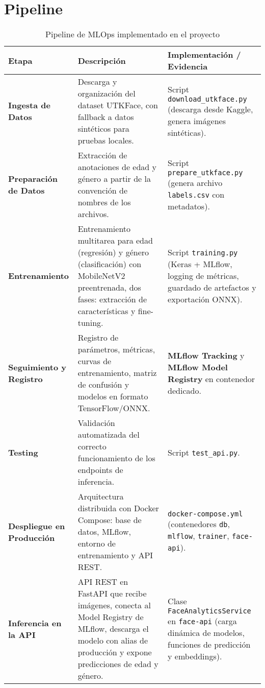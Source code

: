 \section{Pipeline}

\begin{table}[H]
\centering
\caption{Pipeline de MLOps implementado en el proyecto}
\label{tab:pipeline}
\begin{tabularx}{\linewidth}{|X|X|X|}
\toprule
\textbf{Etapa} & \textbf{Descripción} & \textbf{Implementación / Evidencia} \\
\midrule
\small \textbf{Ingesta de Datos} & Descarga y organización del dataset UTKFace, con fallback a datos sintéticos para pruebas locales. & Script \texttt{download\_utkface.py} (descarga desde Kaggle, genera imágenes sintéticas). \\
\midrule
\small \textbf{Preparación de Datos} & Extracción de anotaciones de edad y género a partir de la convención de nombres de los archivos. & Script \texttt{prepare\_utkface.py} (genera archivo \texttt{labels.csv} con metadatos). \\
\midrule
\small \textbf{Entrenamiento} & Entrenamiento multitarea para edad (regresión) y género (clasificación) con MobileNetV2 preentrenada, dos fases: extracción de características y fine-tuning. & Script \texttt{training.py} (Keras + MLflow, logging de métricas, guardado de artefactos y exportación ONNX). \\
\midrule
\small \textbf{Seguimiento y Registro} & Registro de parámetros, métricas, curvas de entrenamiento, matriz de confusión y modelos en formato TensorFlow/ONNX. & \textbf{MLflow Tracking} y \textbf{MLflow Model Registry} en contenedor dedicado. \\
\midrule
\small \textbf{Testing} & Validación automatizada del correcto funcionamiento de los endpoints de inferencia. & Script \texttt{test\_api.py}. \\
\midrule
\small \textbf{Despliegue en Producción} & Arquitectura distribuida con Docker Compose: base de datos, MLflow, entorno de entrenamiento y API REST. & \texttt{docker-compose.yml} (contenedores \texttt{db}, \texttt{mlflow}, \texttt{trainer}, \texttt{face-api}). \\
\midrule
\small \textbf{Inferencia en la API} & API REST en FastAPI que recibe imágenes, conecta al Model Registry de MLflow, descarga el modelo con alias de producción y expone predicciones de edad y género. & Clase \texttt{FaceAnalyticsService} en \texttt{face-api} (carga dinámica de modelos, funciones de predicción y embeddings). \\
\bottomrule
\end{tabularx}
\end{table}
